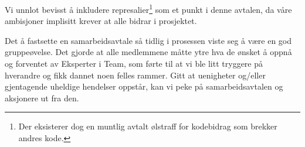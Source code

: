 Vi unnlot bevisst å inkludere represalier\footnote{Der eksisterer dog en muntlig avtalt ølstraff for kodebidrag som brekker andres kode.} som et punkt i denne avtalen, da våre ambisjoner implisitt krever at alle bidrar i prosjektet.

Det å fastsette en samarbeidsavtale så tidlig i prosessen viste seg å
være en god gruppeøvelse. Det gjorde at alle medlemmene måtte ytre hva
de ønsket å oppnå og forventet av Eksperter i Team, som førte til at
vi ble litt tryggere på hverandre og fikk dannet noen felles
rammer. Gitt at uenigheter og/eller gjentagende uheldige hendelser
oppstår, kan vi peke på samarbeidsavtalen og aksjonere ut fra den.



